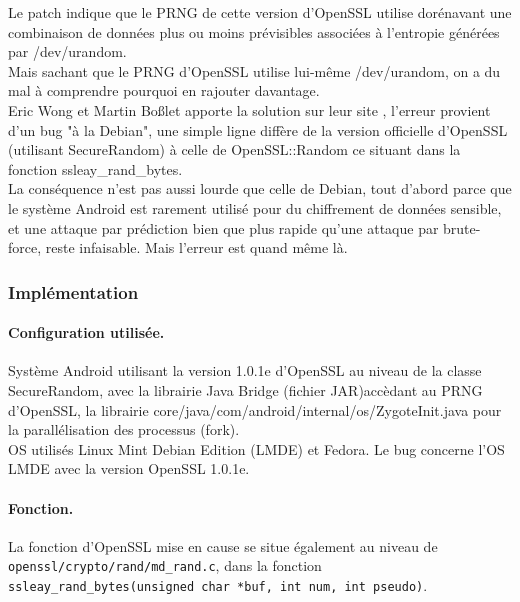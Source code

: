 			Le patch indique que le PRNG de cette version d'OpenSSL utilise dorénavant 
			une combinaison de données plus ou moins prévisibles associées à 
			l'entropie générées par /dev/urandom. \\
			Mais sachant que le PRNG d'OpenSSL utilise lui-même /dev/urandom, on a du 
			mal à comprendre pourquoi en rajouter davantage.\\
		
			Eric Wong et Martin Boßlet apporte la solution sur leur site
			\cite{boblet2013android}, l'erreur 
			provient d'un bug "à la Debian", une simple ligne diffère de la version 
			officielle d'OpenSSL (utilisant SecureRandom) à celle de OpenSSL::Random 
			ce situant dans la fonction ssleay\_rand\_bytes. \\
		
			La conséquence n'est pas aussi lourde que celle de Debian, tout d'abord 
			parce que le système Android est rarement utilisé pour du 
			chiffrement de données sensible, et une attaque par prédiction bien que
			plus rapide qu'une attaque par brute-force, reste infaisable. 
			Mais l'erreur est quand même là. \\
	
		
		\subsubsection{Implémentation}
			
			\paragraph{Configuration utilisée.\\}

			Système Android utilisant la version 1.0.1e d'OpenSSL au 
			niveau de la classe SecureRandom, avec la librairie Java Bridge 
			(fichier JAR)accèdant au PRNG d'OpenSSL, la librairie 
			core/java/com/android/internal/os/ZygoteInit.java pour 
			la parallélisation des processus (fork).\\
			
			OS utilisés Linux Mint Debian Edition (LMDE) et Fedora.
			Le bug concerne l'OS LMDE avec la version OpenSSL 1.0.1e.
			
			\paragraph{Fonction.\\}
			
			La fonction d'OpenSSL mise en cause se situe également
			au niveau de \texttt{openssl/crypto/rand/md\_rand.c}, dans
			la fonction \texttt{ssleay\_rand\_bytes(unsigned char *buf, 
			int num, int pseudo)}.
		
